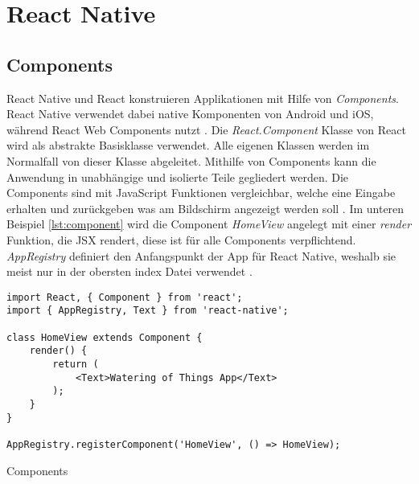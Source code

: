\section{React Native}

\subsection{Components} \label{component}
React Native und React konstruieren Applikationen mit Hilfe von \textit{Components}. React Native verwendet dabei native Komponenten von Android und iOS, während React Web Components nutzt  \cite{facebook_inc._getting_2017}. Die \textit{React.Component} Klasse von React wird als abstrakte Basisklasse verwendet. Alle eigenen Klassen werden im Normalfall von dieser Klasse abgeleitet. Mithilfe von Components kann die Anwendung in unabhängige und isolierte Teile gegliedert werden. Die Components sind mit JavaScript Funktionen vergleichbar, welche eine Eingabe erhalten und zurückgeben was am Bildschirm angezeigt werden soll \cite{facebook_inc._components_2017}. Im unteren Beispiel \ref{lst:component} wird die Component \textit{HomeView} angelegt mit einer \textit{render} Funktion, die JSX rendert, diese ist für alle Components verpflichtend. \textit{AppRegistry} definiert den Anfangspunkt der App für React Native, weshalb sie meist nur in der obersten index Datei verwendet \cite{facebook_inc._getting_2017}. 

\begin{listing}[H]
    \begin{verbatim}
import React, { Component } from 'react';
import { AppRegistry, Text } from 'react-native';

class HomeView extends Component {
    render() {
        return (
            <Text>Watering of Things App</Text>
        );
    }
}

AppRegistry.registerComponent('HomeView', () => HomeView);
    \end{verbatim}
    \caption{Components}
    \label{lst:component}
\end{listing}

